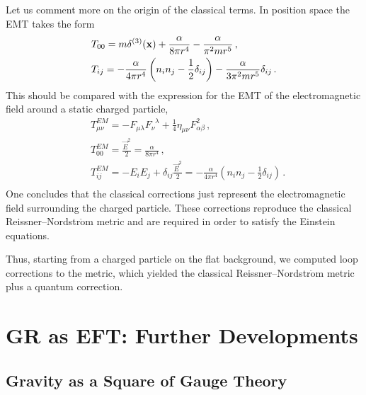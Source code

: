 \documentclass[11pt,a4paper]{article}
\newcommand{\be}{\begin{equation}}
\newcommand{\ee}{\end{equation}}
\newcommand\m{\mu}
\newcommand\n{\nu}
\renewcommand\a{\alpha}
\renewcommand\b{\beta}
\renewcommand\l{\lambda}
\begin{document}
Let us comment more on the origin of the classical terms.
In position space the EMT takes the form
\be
\begin{split}
& T_{00}=m\delta^{(3)}({\bf x}) +\frac{\alpha}{8\pi r^4}-\frac{\alpha}{\pi^2 m r^5}\,,\\
& T_{ij}=-\frac{\alpha}{4\pi r^4}\left(n_in_j-\frac{1}{2}\delta_{ij}\right)-
\frac{\alpha}{3\pi^2 m r^5}\delta_{ij}\,.
\end{split}
\ee
This should be compared with the expression for the EMT of the electromagnetic field around a static charged particle,
\be
\begin{split}
& T^{EM}_{\m \n}=-F_{\m \l}F^{\;\;\l}_{\n} +\frac{1}{4}\eta_{\m \n} F_{\a \b}^2\,,\\
& T^{EM}_{00}=\frac{\vec E^2}{2}=\frac{\a}{8\pi r^4}\,,\\
& T^{EM}_{ij}=-E_iE_j+\delta_{ij}\frac{\vec E^2}{2}=-\frac{\a}{4\pi r^4}\left(n_in_j-\frac{1}{2}\delta_{ij}\right)\,.\\
\end{split}
\ee
One concludes that the classical corrections just represent the electromagnetic field
surrounding the charged particle. These corrections reproduce the classical Reissner--Nordstr$\ddot{\text{o}}$m metric and are required in order to satisfy the Einstein equations.

Thus, starting from a charged particle on the flat background, we computed loop corrections
to the metric, which yielded the classical Reissner--Nordstr$\ddot{\text{o}}$m metric
plus a quantum correction.

\section{GR as EFT: Further Developments}


\subsection{Gravity as a Square of Gauge Theory}
\end{document}
